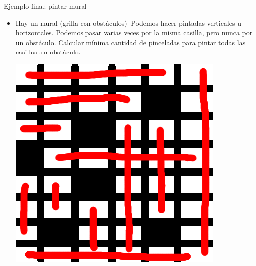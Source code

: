 \documentclass{beamer}
\begin{document}
\begin{frame}{Ejemplo final: pintar mural}
    \begin{itemize}
		\item Hay un mural (grilla con obstáculos). Podemos hacer pintadas verticales u horizontales. Podemos pasar varias veces por la misma casilla, pero nunca por un obstáculo. Calcular mínima cantidad de pinceladas para pintar todas las casillas sin obstáculo.
        
        {\hfill \includegraphics[scale=0.25]{pintapatio.png} \hfill}
        
        \ 
    \end{itemize}
\end{frame}
\end{document}
